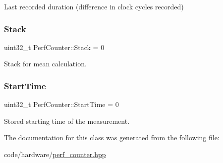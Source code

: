 Last recorded duration (difference in clock cycles recorded) 

\mbox{\label{classPerfCounter_ad440629d44a2bfd9b4d8de185ff66d27}} 
\subsubsection{\texorpdfstring{Stack}{Stack}}
{\footnotesize\ttfamily uint32\+\_\+t Perf\+Counter\+::\+Stack = 0}



Stack for mean calculation. 

\mbox{\label{classPerfCounter_adefe85b05d9c8920877053f6a8ed743c}} 
\subsubsection{\texorpdfstring{Start\+Time}{StartTime}}
{\footnotesize\ttfamily uint32\+\_\+t Perf\+Counter\+::\+Start\+Time = 0}



Stored starting time of the measurement. 



The documentation for this class was generated from the following file\+:\begin{DoxyCompactItemize}
\item 
code/hardware/\hyperlink{perf__counter_8hpp}{perf\+\_\+counter.\+hpp}\end{DoxyCompactItemize}
